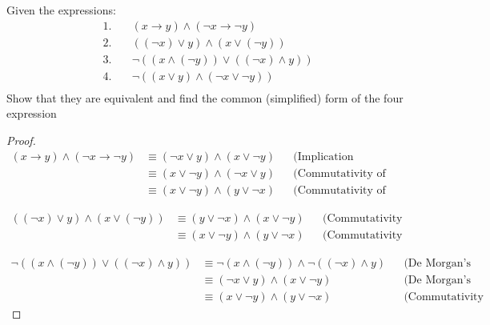         \begin{exercise}
            Given the expressions:
            \begin{align*}
            1. & \quad (x \rightarrow y) \land (\lnot x \rightarrow \lnot y) \\
            2. & \quad ((\lnot x) \lor y) \land (x \lor (\lnot y)) \\
            3. & \quad \lnot((x \land (\lnot y)) \lor ((\lnot x) \land y)) \\
            4. & \quad \lnot((x \lor y) \land (\lnot x \lor \lnot y)) \\
            \end{align*}
            Show that they are equivalent and find the common (simplified) form of the four expression
        \end{exercise}
        \begin{proof}
            \begin{align*}
                (x \rightarrow y) \land (\neg x \rightarrow \neg y) & \equiv (\neg x \lor y) \land (x \lor \neg y) && \text{(Implication equivalence)} \\
                & \equiv (x \lor \neg y) \land (\neg x \lor y) && \text{(Commutativity of OR)} \\
                & \equiv (x \lor \neg y) \land (y \lor \neg x) && \text{(Commutativity of AND)}
                \end{align*}

                \begin{align*}
                    ((\neg x) \lor y) \land (x \lor (\neg y)) & \equiv (y \lor \neg x) \land (x \lor \neg y) && \text{(Commutativity of OR)} \\
                    & \equiv (x \lor \neg y) \land (y \lor \neg x) && \text{(Commutativity of AND)}
                    \end{align*}
            
                    \begin{align*}
                        \neg((x \land (\neg y)) \lor ((\neg x) \land y)) & \equiv \neg(x \land (\neg y)) \land \neg((\neg x) \land y) && \text{(De Morgan's laws)} \\
                        & \equiv (\neg x \lor y) \land (x \lor \neg y) && \text{(De Morgan's laws)} \\
                        & \equiv (x \lor \neg y) \land (y \lor \neg x) && \text{(Commutativity of OR and AND)}
                        \end{align*}


\end{proof}
